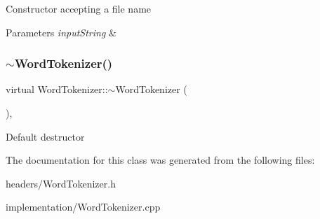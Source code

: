Constructor accepting a file name 
\begin{DoxyParams}{Parameters}
{\em input\+String} & \\
\hline
\end{DoxyParams}
\mbox{\label{classWordTokenizer_a04c986b8527bd4f556443161804b1208}} 
\subsubsection{\texorpdfstring{$\sim$\+Word\+Tokenizer()}{~WordTokenizer()}}
{\footnotesize\ttfamily virtual Word\+Tokenizer\+::$\sim$\+Word\+Tokenizer (\begin{DoxyParamCaption}{ }\end{DoxyParamCaption})\hspace{0.3cm}{\ttfamily [inline]}, {\ttfamily [virtual]}}

Default destructor 

The documentation for this class was generated from the following files\+:\begin{DoxyCompactItemize}
\item 
headers/Word\+Tokenizer.\+h\item 
implementation/Word\+Tokenizer.\+cpp\end{DoxyCompactItemize}
